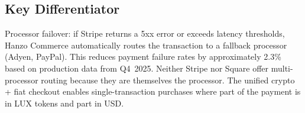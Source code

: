 \subsection{Key Differentiator}

Processor failover: if Stripe returns a 5xx error or exceeds latency thresholds, Hanzo Commerce automatically routes the transaction to a fallback processor (Adyen, PayPal). This reduces payment failure rates by approximately 2.3\% based on production data from Q4~2025. Neither Stripe nor Square offer multi-processor routing because they are themselves the processor. The unified crypto + fiat checkout enables single-transaction purchases where part of the payment is in LUX tokens and part in USD.

